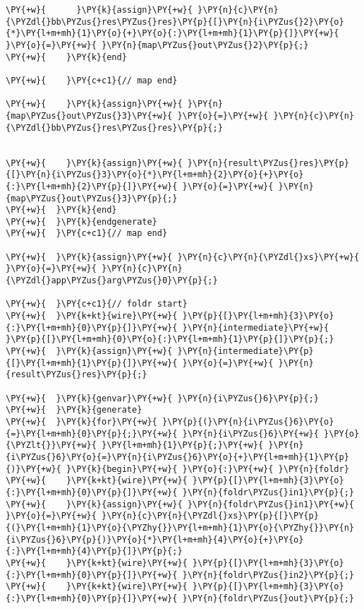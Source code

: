 {\begin{Verbatim}[commandchars=\\\{\}]
\PY{+w}{      }\PY{k}{assign}\PY{+w}{ }\PY{n}{c}\PY{n}{\PYZdl{}bb\PYZus{}res\PYZus{}res}\PY{p}{[}\PY{n}{i\PYZus{}2}\PY{o}{*}\PY{l+m+mh}{1}\PY{o}{+}\PY{o}{:}\PY{l+m+mh}{1}\PY{p}{]}\PY{+w}{ }\PY{o}{=}\PY{+w}{ }\PY{n}{map\PYZus{}out\PYZus{}2}\PY{p}{;}
\PY{+w}{    }\PY{k}{end}

\PY{+w}{    }\PY{c+c1}{// map end}

\PY{+w}{    }\PY{k}{assign}\PY{+w}{ }\PY{n}{map\PYZus{}out\PYZus{}3}\PY{+w}{ }\PY{o}{=}\PY{+w}{ }\PY{n}{c}\PY{n}{\PYZdl{}bb\PYZus{}res\PYZus{}res}\PY{p}{;}


\PY{+w}{    }\PY{k}{assign}\PY{+w}{ }\PY{n}{result\PYZus{}res}\PY{p}{[}\PY{n}{i\PYZus{}3}\PY{o}{*}\PY{l+m+mh}{2}\PY{o}{+}\PY{o}{:}\PY{l+m+mh}{2}\PY{p}{]}\PY{+w}{ }\PY{o}{=}\PY{+w}{ }\PY{n}{map\PYZus{}out\PYZus{}3}\PY{p}{;}
\PY{+w}{  }\PY{k}{end}
\PY{+w}{  }\PY{k}{endgenerate}
\PY{+w}{  }\PY{c+c1}{// map end}

\PY{+w}{  }\PY{k}{assign}\PY{+w}{ }\PY{n}{c}\PY{n}{\PYZdl{}xs}\PY{+w}{ }\PY{o}{=}\PY{+w}{ }\PY{n}{c}\PY{n}{\PYZdl{}app\PYZus{}arg\PYZus{}0}\PY{p}{;}

\PY{+w}{  }\PY{c+c1}{// foldr start}
\PY{+w}{  }\PY{k+kt}{wire}\PY{+w}{ }\PY{p}{[}\PY{l+m+mh}{3}\PY{o}{:}\PY{l+m+mh}{0}\PY{p}{]}\PY{+w}{ }\PY{n}{intermediate}\PY{+w}{ }\PY{p}{[}\PY{l+m+mh}{0}\PY{o}{:}\PY{l+m+mh}{1}\PY{p}{]}\PY{p}{;}
\PY{+w}{  }\PY{k}{assign}\PY{+w}{ }\PY{n}{intermediate}\PY{p}{[}\PY{l+m+mh}{1}\PY{p}{]}\PY{+w}{ }\PY{o}{=}\PY{+w}{ }\PY{n}{result\PYZus{}res}\PY{p}{;}

\PY{+w}{  }\PY{k}{genvar}\PY{+w}{ }\PY{n}{i\PYZus{}6}\PY{p}{;}
\PY{+w}{  }\PY{k}{generate}
\PY{+w}{  }\PY{k}{for}\PY{+w}{ }\PY{p}{(}\PY{n}{i\PYZus{}6}\PY{o}{=}\PY{l+m+mh}{0}\PY{p}{;}\PY{+w}{ }\PY{n}{i\PYZus{}6}\PY{+w}{ }\PY{o}{\PYZlt{}}\PY{+w}{ }\PY{l+m+mh}{1}\PY{p}{;}\PY{+w}{ }\PY{n}{i\PYZus{}6}\PY{o}{=}\PY{n}{i\PYZus{}6}\PY{o}{+}\PY{l+m+mh}{1}\PY{p}{)}\PY{+w}{ }\PY{k}{begin}\PY{+w}{ }\PY{o}{:}\PY{+w}{ }\PY{n}{foldr}
\PY{+w}{    }\PY{k+kt}{wire}\PY{+w}{ }\PY{p}{[}\PY{l+m+mh}{3}\PY{o}{:}\PY{l+m+mh}{0}\PY{p}{]}\PY{+w}{ }\PY{n}{foldr\PYZus{}in1}\PY{p}{;}
\PY{+w}{    }\PY{k}{assign}\PY{+w}{ }\PY{n}{foldr\PYZus{}in1}\PY{+w}{ }\PY{o}{=}\PY{+w}{ }\PY{n}{c}\PY{n}{\PYZdl{}xs}\PY{p}{[}\PY{p}{(}\PY{l+m+mh}{1}\PY{o}{\PYZhy{}}\PY{l+m+mh}{1}\PY{o}{\PYZhy{}}\PY{n}{i\PYZus{}6}\PY{p}{)}\PY{o}{*}\PY{l+m+mh}{4}\PY{o}{+}\PY{o}{:}\PY{l+m+mh}{4}\PY{p}{]}\PY{p}{;}
\PY{+w}{    }\PY{k+kt}{wire}\PY{+w}{ }\PY{p}{[}\PY{l+m+mh}{3}\PY{o}{:}\PY{l+m+mh}{0}\PY{p}{]}\PY{+w}{ }\PY{n}{foldr\PYZus{}in2}\PY{p}{;}
\PY{+w}{    }\PY{k+kt}{wire}\PY{+w}{ }\PY{p}{[}\PY{l+m+mh}{3}\PY{o}{:}\PY{l+m+mh}{0}\PY{p}{]}\PY{+w}{ }\PY{n}{foldr\PYZus{}out}\PY{p}{;}


\end{Verbatim}}
